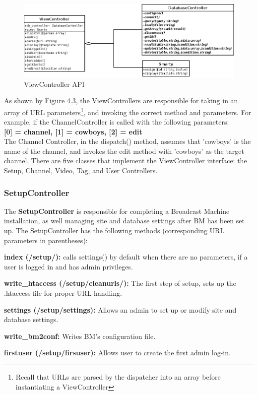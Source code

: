 \documentclass[a4paper,12pt]{report}
\begin{document}
\begin{figure}[htp]
\begin{center}
\includegraphics[scale=0.5]{./images/controllers.png}
\end{center}
\caption{ViewController API}
\end{figure}

As shown by Figure 4.3, the ViewControllers are responsible for taking in an array of URL parameters\footnote{Recall that URLs are parsed by the dispatcher into an array before instantiating a ViewController}, and invoking the correct method and parameters. For example, if the ChannelController is called with the following parameters: \\

\textbf{[0] = channel, [1] = cowboys, [2] = edit} \\

The Channel Controller, in the dispatch() method, assumes that 'cowboys' is the name of the channel, and invokes the edit method with 'cowboys' as the target channel. There are five classes that implement the ViewController interface: the Setup, Channel, Video, Tag, and User Controllers. \\

\subsubsection{SetupController}
The \textbf{SetupController} is responsible for completing a Broadcast Machine installation, as well managing site  and database settings after BM has been set up. The SetupController has the following methods (corresponding URL parameters in parentheses):
\begin{description}
\item{\textbf{index (/setup/): }calls settings() by default when there are no parameters, if a user is logged in and has admin privileges.}
\item{\textbf{write\_htaccess (/setup/cleanurls/): }The first step of setup, sets up the .htaccess file for proper URL handling.}
\item{\textbf{settings (/setup/settings): } Allows an admin to set up or modify site and database settings.}
\item{\textbf{write\_bm2conf: } Writes BM's configuration file.}
\item{\textbf{firstuser (/setup/firsuser): } Allows user to create the first admin log-in.} \\
\end{description} 
\end{document}
